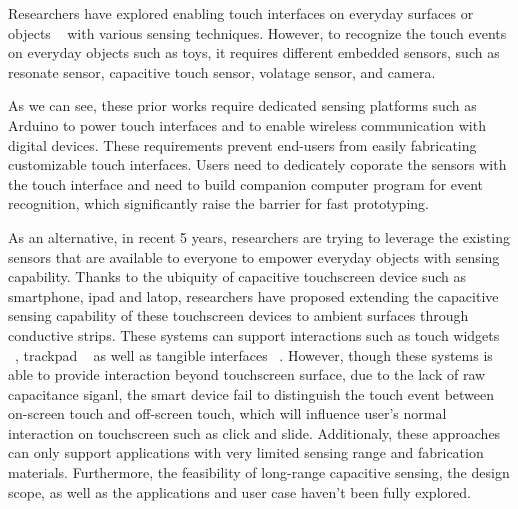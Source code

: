 Researchers have explored enabling touch interfaces on everyday surfaces or objects ~\cite{Ono-Touch-and-Activate, Ono-2014,Sato-Touche, Xiao-WorldKit, Rekimoto-SmartSkin, olberding2013cuttable, Zhang-Electrick} with various sensing techniques. However, to recognize the touch events on everyday objects such as toys, it requires different embedded sensors, such as resonate sensor, capacitive touch sensor, volatage sensor, and camera. 

As we can see, these prior works require dedicated sensing platforms such as Arduino to power touch interfaces and to enable wireless communication with digital devices. These requirements prevent end-users from easily fabricating customizable touch interfaces. Users need to dedicately coporate the sensors with the touch interface and need to build companion computer program for event recognition, which significantly raise the barrier for fast prototyping. 

As an alternative, in recent 5 years, researchers are trying to leverage the existing sensors that are available to everyone to empower everyday objects with sensing capability. Thanks to the ubiquity of capacitive touchscreen device such as smartphone, ipad and latop, researchers have proposed extending the capacitive sensing capability of these touchscreen devices to ambient surfaces through conductive strips. These systems can support interactions such as touch widgets ~\cite{Kato2015a,Kato2015,Kato2016}, trackpad ~\cite{mobicom-gao18} as well as tangible interfaces ~\cite{Schmitz2017, Schmitz2018, Chan-CapStones}. However, though these systems is able to provide interaction beyond touchscreen surface, due to the lack of raw capacitance siganl, the smart device fail to distinguish the touch event between on-screen touch and off-screen touch, which will influence user's normal interaction on touchscreen such as click and slide. Additionaly, these approaches can only support applications with very limited sensing range and fabrication materials. Furthermore, the feasibility of long-range capacitive sensing, the design scope, as well as the applications and user case haven't been fully explored.

